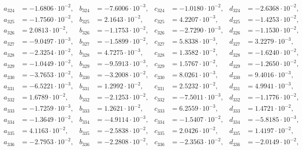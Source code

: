 \begin{align*}
  a_{ 324 } &= -1.6806 \cdot 10^{ -2 }, & b_{ 324 } &= -7.6006 \cdot 10^{ -3 }, & c_{ 324 } &= -1.0180 \cdot 10^{ -2 }, & d_{ 324 } &= -2.6368 \cdot 10^{ -2 }, \\ 
  a_{ 325 } &= -1.7560 \cdot 10^{ -2 }, & b_{ 325 } &= 2.1643 \cdot 10^{ -2 }, & c_{ 325 } &= 4.2207 \cdot 10^{ -3 }, & d_{ 325 } &= -1.4253 \cdot 10^{ -2 }, \\ 
  a_{ 326 } &= 2.0813 \cdot 10^{ -2 }, & b_{ 326 } &= -1.1753 \cdot 10^{ -2 }, & c_{ 326 } &= -2.7290 \cdot 10^{ -3 }, & d_{ 326 } &= -1.1530 \cdot 10^{ -2 }, \\ 
  a_{ 327 } &= -9.0497 \cdot 10^{ -3 }, & b_{ 327 } &= -1.5899 \cdot 10^{ -2 }, & c_{ 327 } &= 5.8338 \cdot 10^{ -3 }, & d_{ 327 } &= 3.2279 \cdot 10^{ -3 }, \\ 
  a_{ 328 } &= -2.3254 \cdot 10^{ -2 }, & b_{ 328 } &= 4.7275 \cdot 10^{ -3 }, & c_{ 328 } &= 1.3582 \cdot 10^{ -2 }, & d_{ 328 } &= -1.6240 \cdot 10^{ -2 }, \\ 
  a_{ 329 } &= -1.0449 \cdot 10^{ -2 }, & b_{ 329 } &= -9.5913 \cdot 10^{ -3 }, & c_{ 329 } &= 1.5767 \cdot 10^{ -2 }, & d_{ 329 } &= -1.2650 \cdot 10^{ -2 }, \\ 
  a_{ 330 } &= -3.7653 \cdot 10^{ -2 }, & b_{ 330 } &= -3.2008 \cdot 10^{ -2 }, & c_{ 330 } &= 8.0261 \cdot 10^{ -3 }, & d_{ 330 } &= 9.4016 \cdot 10^{ -3 }, \\ 
  a_{ 331 } &= -6.5221 \cdot 10^{ -3 }, & b_{ 331 } &= 1.2992 \cdot 10^{ -2 }, & c_{ 331 } &= 2.5232 \cdot 10^{ -2 }, & d_{ 331 } &= 4.9941 \cdot 10^{ -3 }, \\ 
  a_{ 332 } &= 1.6789 \cdot 10^{ -2 }, & b_{ 332 } &= -2.1253 \cdot 10^{ -2 }, & c_{ 332 } &= -7.5011 \cdot 10^{ -3 }, & d_{ 332 } &= -1.1776 \cdot 10^{ -2 }, \\ 
  a_{ 333 } &= -1.7259 \cdot 10^{ -3 }, & b_{ 333 } &= 1.2621 \cdot 10^{ -2 }, & c_{ 333 } &= 6.2559 \cdot 10^{ -3 }, & d_{ 333 } &= 1.4721 \cdot 10^{ -2 }, \\ 
  a_{ 334 } &= -1.3649 \cdot 10^{ -2 }, & b_{ 334 } &= -4.9114 \cdot 10^{ -3 }, & c_{ 334 } &= -1.5407 \cdot 10^{ -2 }, & d_{ 334 } &= -5.8185 \cdot 10^{ -3 }, \\ 
  a_{ 335 } &= 4.1163 \cdot 10^{ -2 }, & b_{ 335 } &= -2.5838 \cdot 10^{ -2 }, & c_{ 335 } &= 2.0426 \cdot 10^{ -2 }, & d_{ 335 } &= 1.4197 \cdot 10^{ -2 }, \\ 
  a_{ 336 } &= -2.7953 \cdot 10^{ -2 }, & b_{ 336 } &= -2.2808 \cdot 10^{ -2 }, & c_{ 336 } &= -2.3563 \cdot 10^{ -2 }, & d_{ 336 } &= -2.0149 \cdot 10^{ -2 }, \\ 

\end{align*}
